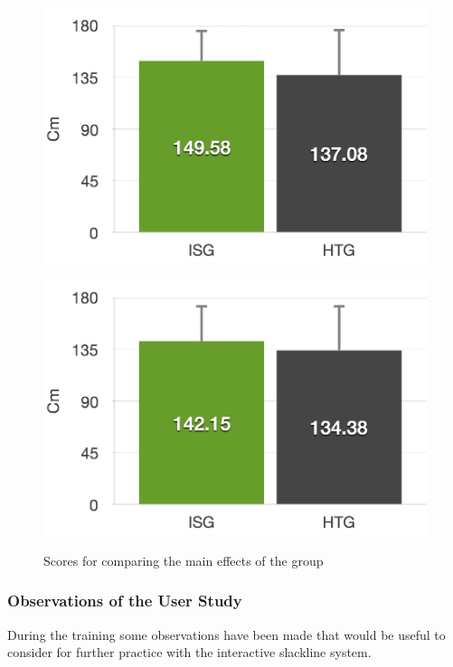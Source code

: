 \begin{figure}[htb]
\begin{minipage}[t]{0.40\linewidth}
		\includegraphics[width=1\linewidth]{Pictures/6_4_DIA_DistanceLeftGroupEffect}
		\label{fig:6_4_distanceLeftGroupEffect}
	\end{minipage}
	\hfill
	\begin{minipage}[t]{0.40\linewidth}
		\centering
		\includegraphics[width=1\linewidth]{Pictures/6_4_DIA_DistanceRightGroupEffect}
		\label{fig:6_4_distanceRightGroupEffect}
	\end{minipage}
	\caption{Scores for comparing the main effects of the group}
	\label{fig:6_4_mainEffectGroup}
\end{figure}

\subsubsection{Observations of the User Study}\label{6_4_slacklineObservations}
During the training some observations have been made that would be useful to consider for further practice with the interactive slackline system.

